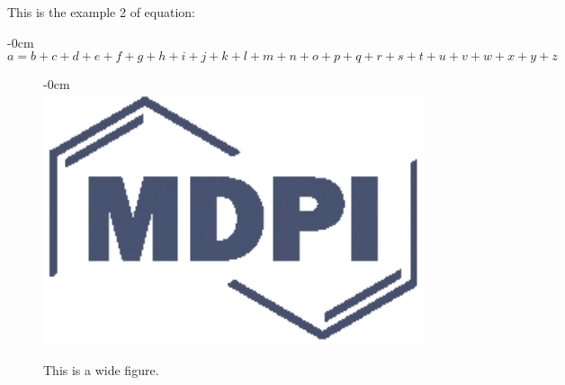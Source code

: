 \documentclass[energies,article,submit,pdftex,moreauthors]{Definitions/mdpi}
\begin{document}
This is the example 2 of equation:
\begin{adjustwidth}{-\extralength}{0cm}
\begin{equation}
a = b + c + d + e + f + g + h + i + j + k + l + m + n + o + p + q + r + s + t + u + v + w + x + y + z
\end{equation}
\end{adjustwidth}


\begin{figure}[H]
\begin{adjustwidth}{-\extralength}{0cm}
\centering
\includegraphics[width=13.5cm]{Definitions/logo-mdpi}
\end{adjustwidth}
\caption{This is a wide figure.\label{fig2}}
\end{figure}  
\end{document}
